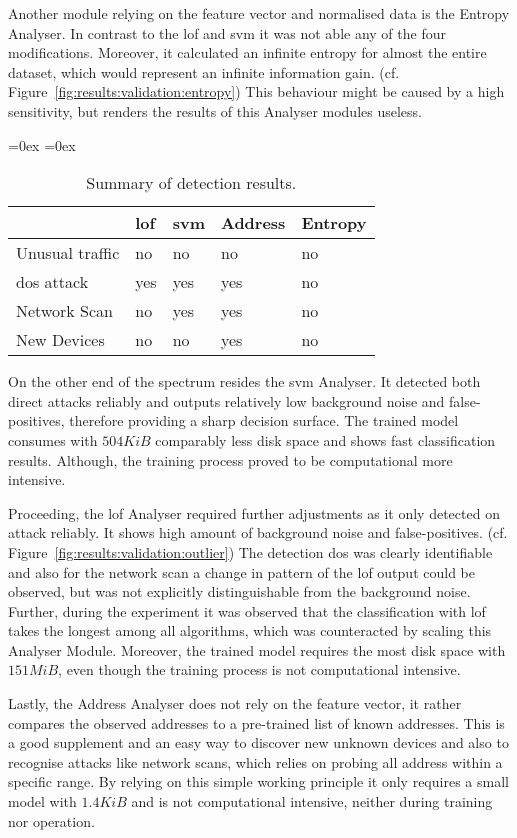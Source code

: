 Another module relying on the feature vector and normalised data is the Entropy Analyser.
In contrast to the \gls{lof} and \gls{svm} it was not able any of the four modifications. Moreover, it calculated an infinite entropy for almost the entire dataset, which would represent an infinite information gain. (cf. Figure~\ref{fig:results:validation:entropy})
This behaviour might be caused by a high sensitivity, but renders the results of this Analyser modules useless.

\begin{table}[h]
	\aboverulesep=0ex
	\belowrulesep=0ex
	\renewcommand{\arraystretch}{1.2}
	
	\centering
	\begin{tabularx}{0.95\textwidth}{|l|Y|Y|Y|Y|}
		\toprule
		& \gls{lof} & \gls{svm} & Address & Entropy \\\midrule
		Unusual traffic & no & no & no & no \\\midrule
		\gls{dos} attack & yes & yes & yes & no \\\midrule
		Network Scan & no & yes & yes & no \\\midrule
		New Devices & no & no & yes & no \\\midrule
	\end{tabularx}
	\caption[Summary of detection results]{Summary of detection results.}
	\label{tab:results:conclusion}
\end{table}

On the other end of the spectrum resides the \gls{svm} Analyser. It detected both direct attacks reliably and outputs relatively low background noise and false-positives, therefore providing a sharp decision surface.
The trained model consumes with $504 KiB$ comparably less disk space and shows fast classification results. Although, the training process proved to be computational more intensive.

Proceeding, the \gls{lof} Analyser required further adjustments as it only detected on attack reliably.
It shows high amount of background noise and false-positives. (cf. Figure~\ref{fig:results:validation:outlier}) The detection \gls{dos} was clearly identifiable and also for the network scan a change in pattern of the \gls{lof} output could be observed, but was not explicitly distinguishable from the background noise.
Further, during the experiment it was observed that the classification with \gls{lof} takes the longest among all algorithms, which was counteracted by scaling this Analyser Module.
Moreover, the trained model requires the most disk space with $151 MiB$, even though the training process is not computational intensive.

Lastly, the Address Analyser does not rely on the feature vector, it rather compares the observed addresses to a pre-trained list of known addresses. This is a good supplement and an easy way to discover new unknown devices and also to recognise attacks like network scans, which relies on probing all address within a specific range.
By relying on this simple working principle it only requires a small model with $1.4 KiB$ and is not computational intensive, neither during training nor operation.


